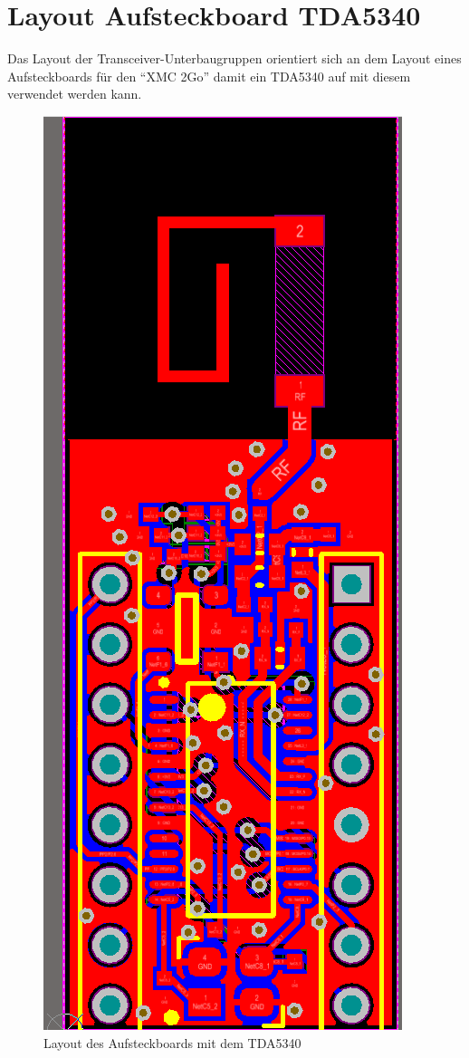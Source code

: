 \section{Layout Aufsteckboard TDA5340}
\label{app:Aufsteckboard}
Das Layout der Transceiver-Unterbaugruppen orientiert sich an dem Layout eines Aufsteckboards für den \enquote{XMC 2Go} damit ein TDA5340 auf mit diesem verwendet werden kann. 

\begin{figure}[H] 
	\centering
	\includegraphics[height=\textwidth, angle=-90 ]{Abbildungen/Aufnahmen/Bilder/Altium/Layout_Stefan_Erhard/Layout.png}
	\caption{Layout des Aufsteckboards mit dem TDA5340}
	\label{fig:AufsteckboardTDA}
\end{figure}